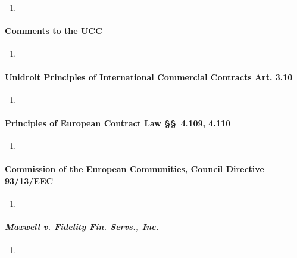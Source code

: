 \begin{enumerate}
    \item %
\end{enumerate}

\paragraph{Comments to the UCC}

\begin{enumerate}
    \item %
\end{enumerate}

\paragraph{Unidroit Principles of International Commercial Contracts Art. 
3.10}

\begin{enumerate}
    \item %
\end{enumerate}

\paragraph{Principles of European Contract Law \S\S\ 4.109, 4.110}

\begin{enumerate}
    \item %
\end{enumerate}

\paragraph{Commission of the European Communities, Council Directive 
93/13/EEC}

\begin{enumerate}
    \item %
\end{enumerate}

\paragraph{\emph{Maxwell v. Fidelity Fin. Servs., Inc.}}

\begin{enumerate}
    \item %
\end{enumerate}

